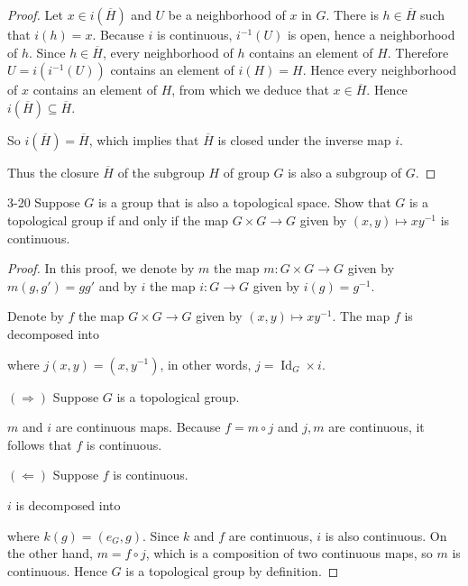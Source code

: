 \begin{proof}
	Let $x \in i(\overline{H})$ and $U$ be a neighborhood of $x$ in $G$. There is $h\in \overline{H}$ such that $i(h) = x$. Because $i$ is continuous, $i^{-1}(U)$ is open, hence a neighborhood of $h$. Since $h\in \overline{H}$, every neighborhood of $h$ contains an element of $H$. Therefore $U = i(i^{-1}(U))$ contains an element of $i(H) = H$. Hence every neighborhood of $x$ contains an element of $H$, from which we deduce that $x \in \overline{H}$. Hence $i(\overline{H}) \subseteq \overline{H}$.

	So $i(\overline{H}) = \overline{H}$, which implies that $\overline{H}$ is closed under the inverse map $i$.

	Thus the closure $\overline{H}$ of the subgroup $H$ of group $G$ is also a subgroup of $G$.
\end{proof}

\begin{problem}{3-20}
Suppose $G$ is a group that is also a topological space. Show that $G$ is a topological group if and only if the map $G\times G\to G$ given by $(x, y) \mapsto xy^{-1}$ is continuous.
\end{problem}

\begin{proof}
	In this proof, we denote by $m$ the map $m: G\times G\to G$ given by $m(g, g') = gg'$ and by $i$ the map $i: G\to G$ given by $i(g) = g^{-1}$.

	Denote by $f$ the map $G\times G\to G$ given by $(x, y) \mapsto xy^{-1}$. The map $f$ is decomposed into
	\begin{center}
	\end{center}

	where $j(x, y) = (x, y^{-1})$, in other words, $j = \operatorname{Id}_{G} \times i$.

	$(\Longrightarrow)$ Suppose $G$ is a topological group.

	$m$ and $i$ are continuous maps. Because $f = m\circ j$ and $j, m$ are continuous, it follows that $f$ is continuous.

	$(\Longleftarrow)$ Suppose $f$ is continuous.

	$i$ is decomposed into
	\begin{center}
	\end{center}

	where $k(g) = (e_{G}, g)$. Since $k$ and $f$ are continuous, $i$ is also continuous. On the other hand, $m = f \circ j$, which is a composition of two continuous maps, so $m$ is continuous. Hence $G$ is a topological group by definition.
\end{proof}

